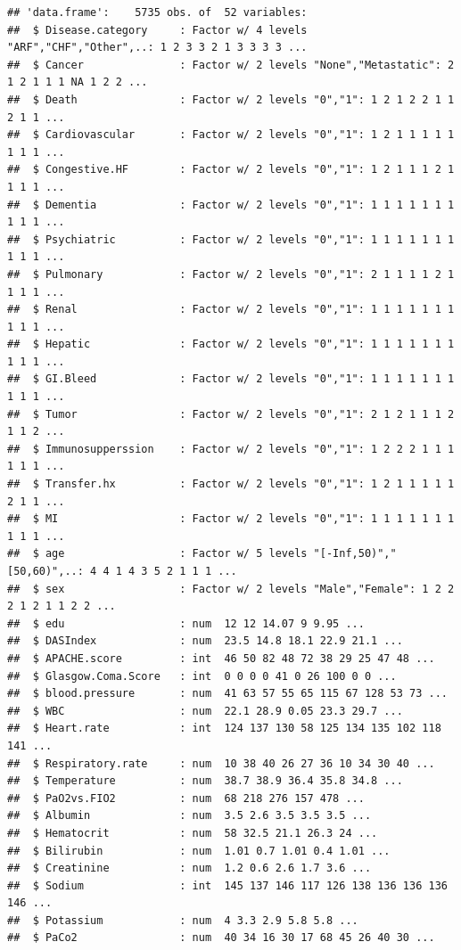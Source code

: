 \documentclass[
]{article}
\begin{document}
\begin{verbatim}
## 'data.frame':    5735 obs. of  52 variables:
##  $ Disease.category     : Factor w/ 4 levels "ARF","CHF","Other",..: 1 2 3 3 2 1 3 3 3 3 ...
##  $ Cancer               : Factor w/ 2 levels "None","Metastatic": 2 1 2 1 1 1 NA 1 2 2 ...
##  $ Death                : Factor w/ 2 levels "0","1": 1 2 1 2 2 1 1 2 1 1 ...
##  $ Cardiovascular       : Factor w/ 2 levels "0","1": 1 2 1 1 1 1 1 1 1 1 ...
##  $ Congestive.HF        : Factor w/ 2 levels "0","1": 1 2 1 1 1 2 1 1 1 1 ...
##  $ Dementia             : Factor w/ 2 levels "0","1": 1 1 1 1 1 1 1 1 1 1 ...
##  $ Psychiatric          : Factor w/ 2 levels "0","1": 1 1 1 1 1 1 1 1 1 1 ...
##  $ Pulmonary            : Factor w/ 2 levels "0","1": 2 1 1 1 1 2 1 1 1 1 ...
##  $ Renal                : Factor w/ 2 levels "0","1": 1 1 1 1 1 1 1 1 1 1 ...
##  $ Hepatic              : Factor w/ 2 levels "0","1": 1 1 1 1 1 1 1 1 1 1 ...
##  $ GI.Bleed             : Factor w/ 2 levels "0","1": 1 1 1 1 1 1 1 1 1 1 ...
##  $ Tumor                : Factor w/ 2 levels "0","1": 2 1 2 1 1 1 2 1 1 2 ...
##  $ Immunosupperssion    : Factor w/ 2 levels "0","1": 1 2 2 2 1 1 1 1 1 1 ...
##  $ Transfer.hx          : Factor w/ 2 levels "0","1": 1 2 1 1 1 1 1 2 1 1 ...
##  $ MI                   : Factor w/ 2 levels "0","1": 1 1 1 1 1 1 1 1 1 1 ...
##  $ age                  : Factor w/ 5 levels "[-Inf,50)","[50,60)",..: 4 4 1 4 3 5 2 1 1 1 ...
##  $ sex                  : Factor w/ 2 levels "Male","Female": 1 2 2 2 1 2 1 1 2 2 ...
##  $ edu                  : num  12 12 14.07 9 9.95 ...
##  $ DASIndex             : num  23.5 14.8 18.1 22.9 21.1 ...
##  $ APACHE.score         : int  46 50 82 48 72 38 29 25 47 48 ...
##  $ Glasgow.Coma.Score   : int  0 0 0 0 41 0 26 100 0 0 ...
##  $ blood.pressure       : num  41 63 57 55 65 115 67 128 53 73 ...
##  $ WBC                  : num  22.1 28.9 0.05 23.3 29.7 ...
##  $ Heart.rate           : int  124 137 130 58 125 134 135 102 118 141 ...
##  $ Respiratory.rate     : num  10 38 40 26 27 36 10 34 30 40 ...
##  $ Temperature          : num  38.7 38.9 36.4 35.8 34.8 ...
##  $ PaO2vs.FIO2          : num  68 218 276 157 478 ...
##  $ Albumin              : num  3.5 2.6 3.5 3.5 3.5 ...
##  $ Hematocrit           : num  58 32.5 21.1 26.3 24 ...
##  $ Bilirubin            : num  1.01 0.7 1.01 0.4 1.01 ...
##  $ Creatinine           : num  1.2 0.6 2.6 1.7 3.6 ...
##  $ Sodium               : int  145 137 146 117 126 138 136 136 136 146 ...
##  $ Potassium            : num  4 3.3 2.9 5.8 5.8 ...
##  $ PaCo2                : num  40 34 16 30 17 68 45 26 40 30 ...

\end{verbatim}
\end{document}
